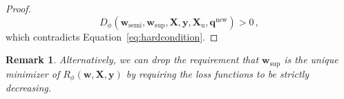 \documentclass[twoside]{memoir}\usepackage[]{graphicx}\usepackage{xcolor}
\newtheorem{remark}{Remark}
\begin{document}
\begin{proof}
$$ {D}_\phi(\mathbf{w}_\mathrm{semi},\mathbf{w}_\mathrm{sup},\mathbf{X},\mathbf{y},\mathbf{X}_\mathrm{u},\mathbf{q}^\mathrm{new}) > 0 \, ,$$
which contradicts Equation~\eqref{eq:hardcondition}.
\end{proof}

\begin{remark}
Alternatively, we can drop the requirement that $\mathbf{w}_\mathrm{sup}$ is the unique minimizer of $ {R}_\phi(\mathbf{w},\mathbf{X},\mathbf{y})$ by requiring the loss functions to be strictly decreasing.
\end{remark}

\end{document}
